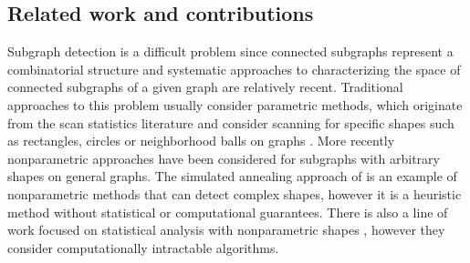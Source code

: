 \documentclass{article}
\begin{document}

\subsection{Related work and contributions}


Subgraph detection is a difficult problem since connected subgraphs represent a combinatorial structure and systematic approaches to characterizing the space of connected subgraphs of a given graph are relatively recent. 
%
%
%
Traditional approaches to this problem usually consider parametric methods, which originate from the scan statistics literature \cite{scan} and consider scanning for specific shapes such as rectangles, circles or neighborhood balls on graphs \cite{disease,kulldorf,priebe}. More recently nonparametric approaches have been considered for subgraphs with arbitrary shapes on general graphs. The simulated annealing approach of \cite{duczmal} is an example of nonparametric methods that can detect complex shapes, however it is a heuristic method without statistical or computational guarantees. There is also a line of work focused on statistical analysis with nonparametric shapes \cite{addario,maze,arias}, however they consider computationally intractable algorithms. 
\end{document}
